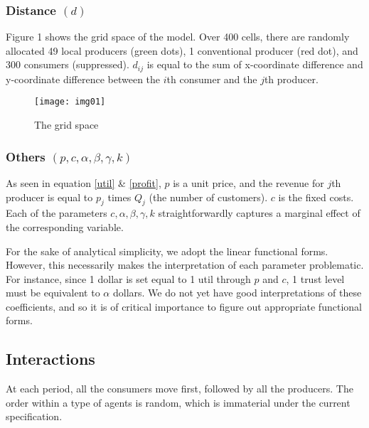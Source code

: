 \documentclass[11pt, oneside]{article}
\begin{document}
\subsubsection{Distance $(d)$}
Figure 1 shows the grid space of the model. Over 400 cells, there are randomly allocated 49 local producers (green dots), 1 conventional producer (red dot), and 300 consumers (suppressed). $d_{ij}$ is equal to the sum of x-coordinate difference and y-coordinate difference between the $i$th consumer and the $j$th producer.
\begin{figure}[h]
\centering
  \texttt{[image: img01]}
  \caption{The grid space}
\end{figure}

\subsubsection{Others $(p, c, \alpha, \beta, \gamma, k)$}
As seen in equation \ref{util} \& \ref{profit}, $p$ is a unit price, and the revenue for $j$th producer is equal to $p_j$ times $Q_j$ (the number of customers). $c$ is the fixed costs. Each of the parameters $c, \alpha, \beta, \gamma, k$ straightforwardly captures a marginal effect of the corresponding variable.

For the sake of analytical simplicity, we adopt the linear functional forms. However, this necessarily makes the interpretation of each parameter problematic. For instance, since 1 dollar is set equal to 1 util through $p$ and $c$, 1 trust level must be equivalent to $\alpha$ dollars. We do not yet have good interpretations of these coefficients, and so it is of critical importance to figure out appropriate functional forms.

\subsection{Interactions}
At each period, all the consumers move first, followed by all the producers. The order within a type of agents is random, which is immaterial under the current specification. 
\end{document}
